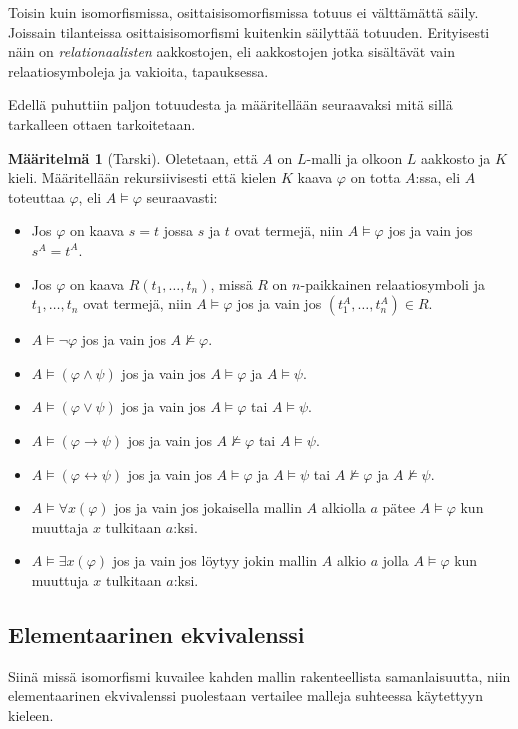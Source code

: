 \documentclass[finnish]{tktltiki2}
\theoremstyle{definition}
\newtheorem{maar}[lau]{Määritelmä}
\theoremstyle{remark}
\begin{document}
Toisin kuin isomorfismissa, osittaisisomorfismissa totuus ei välttämättä säily. Joissain tilanteissa osittaisisomorfismi kuitenkin säilyttää totuuden. Erityisesti näin on \textit{relationaalisten} aakkostojen, eli aakkostojen jotka sisältävät vain relaatiosymboleja ja vakioita, tapauksessa.

Edellä puhuttiin paljon totuudesta ja määritellään seuraavaksi mitä sillä tarkalleen ottaen tarkoitetaan.

\begin{maar}[Tarski]
Oletetaan, että $A$ on $L$-malli ja olkoon $L$ aakkosto ja $K$ kieli. Määritellään rekursiivisesti että kielen $K$ kaava $\varphi$ on totta $A$:ssa, eli $A$ toteuttaa $\varphi$, eli $A \models \varphi$ seuraavasti:
\begin{itemize}
\item Jos $\varphi$ on kaava $s = t$ jossa $s$ ja $t$ ovat termejä, niin $A \models \varphi$ jos ja vain jos $s^A = t^A$.
\item Jos $\varphi$ on kaava $R(t_1, \ldots, t_n)$, missä $R$ on $n$-paikkainen relaatiosymboli ja $t_1, \ldots, t_n$ ovat termejä, niin $A \models \varphi$ jos ja vain jos $(t_1^A, \ldots, t_n^A) \in R$.
\item $A \models \neg \varphi$ jos ja vain jos $A \not \models \varphi$.
\item $A \models (\varphi \land \psi)$ jos ja vain jos $A \models \varphi$ ja $A \models \psi$.
\item $A \models (\varphi \lor \psi)$ jos ja vain jos $A \models \varphi$ tai $A \models \psi$.
\item $A \models (\varphi \to \psi)$ jos ja vain jos $A \not \models \varphi$ tai $A \models \psi$.
\item $A \models (\varphi \leftrightarrow \psi)$ jos ja vain jos $A \models \varphi$ ja $A \models \psi$ tai $A \not \models \varphi$ ja $A \not \models \psi$.
\item $A \models \forall x(\varphi)$ jos ja vain jos jokaisella mallin $A$ alkiolla $a
$ pätee $A \models \varphi$ kun muuttaja $x$ tulkitaan $a$:ksi.
\item $A \models \exists x(\varphi)$ jos ja vain jos löytyy jokin mallin $A$ alkio $a$ jolla $A \models \varphi$ kun muuttuja $x$ tulkitaan $a$:ksi.
\end{itemize}
\end{maar}

\subsection{Elementaarinen ekvivalenssi}
Siinä missä isomorfismi kuvailee kahden mallin rakenteellista samanlaisuutta, niin elementaarinen ekvivalenssi puolestaan vertailee malleja suhteessa käytettyyn kieleen.
\end{document}
